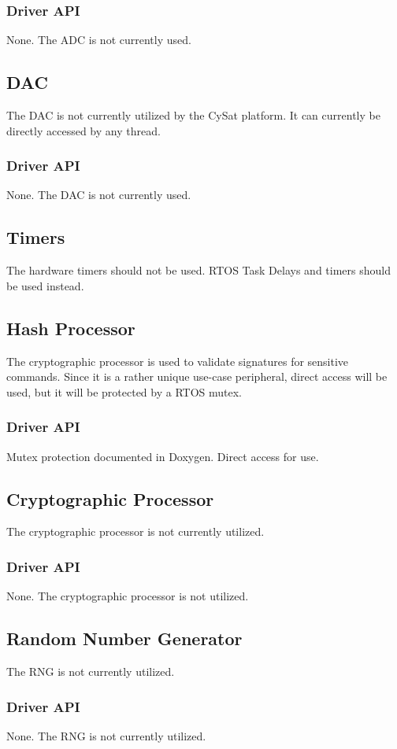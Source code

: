 \documentclass[10pt]{extarticle}
\begin{document}
\subsubsection{Driver API}
None. The ADC is not currently used.

\subsection{DAC}
The DAC is not currently utilized by the CySat platform. It can currently
be directly accessed by any thread.
\subsubsection{Driver API}
None. The DAC is not currently used.

\subsection{Timers}
The hardware timers should not be used. RTOS Task Delays and timers should be used instead.

\subsection{Hash Processor}
The cryptographic processor is used to validate signatures for sensitive commands. Since it
is a rather unique use-case peripheral, direct access will be used, but it will be
protected by a RTOS mutex.
\subsubsection{Driver API}
Mutex protection documented in Doxygen. Direct access for use.

\subsection{Cryptographic Processor}
The cryptographic processor is not currently utilized.
\subsubsection{Driver API}
None. The cryptographic processor is not utilized.

\subsection{Random Number Generator}
The RNG is not currently utilized.
\subsubsection{Driver API}
None. The RNG is not currently utilized.
\end{document}
